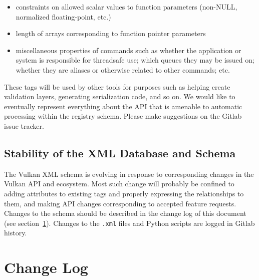 \documentclass{article}
\def\code#1{{\tt #1}}
\begin{document}
\begin{itemize}
\item constraints on allowed scalar values to function parameters (non-NULL,
      normalized floating-point, etc.)
\item length of arrays corresponding to function pointer parameters
\item miscellaneous properties of commands such as whether the application
      or system is responsible for threadsafe use; which queues they may be
      issued on; whether they are aliases or otherwise related to other
      commands; etc.
\end{itemize}

These tags will be used by other tools for purposes such as helping create
validation layers, generating serialization code, and so on. We would like to
eventually represent everything about the API that is amenable to automatic
processing within the registry schema. Please make suggestions on the Gitlab
issue tracker.


\subsection{Stability of the XML Database and Schema}
\label{general:stability}

The Vulkan XML schema is evolving in response to corresponding
changes in the Vulkan API and ecosystem. Most such change will probably be
confined to adding attributes to existing tags and properly expressing the
relationships to them, and making API changes corresponding to accepted
feature requests. Changes to the schema should be described in the change
log of this document (see section~\ref{changelog}). Changes to the
\code{.xml} files and Python scripts are logged in Gitlab history.


\section{Change Log}
\label{changelog}
\end{document}
